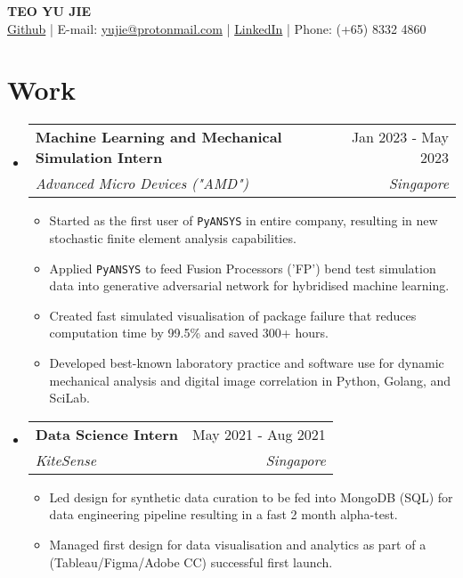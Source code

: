 \documentclass[letterpaper,11pt]{article}
\makeatletter
\newcommand{\resumeItem}[1]{
  \item{
    {#1 \vspace{-4pt}}
  }
}
\newcommand{\resumeSubheading}[4]{
  \vspace{-4pt}\item
    \begin{tabular*}{0.97\textwidth}[t]{l@{\extracolsep{\fill}}r}
      \textbf{#1} & #2 \\
      \textit{\small #3} & \textit{\small #4} \\
    \end{tabular*}\vspace{-10pt}
}
\newcommand{\resumeSubHeadingListStart}{\begin{itemize}[leftmargin=0.15in, label={}]}
\newcommand{\resumeSubHeadingListEnd}{\end{itemize}}
\newcommand{\resumeItemListStart}{\begin{itemize}}
\newcommand{\resumeItemListEnd}{\end{itemize}\vspace{-2pt}}
\makeatother
\begin{document}
\begin{center}
    {\Huge \textbf{TEO YU JIE}} \\ \vspace{3pt}
    \href{{https://github.com/yujieteo}}{\color{blue}Github} |
    E-mail: \href{mailto:{yujie@protonmail.com}}{\color{blue}yujie@protonmail.com} |
    \href{https://www.linkedin.com/in/yujieteo/}{\color{blue}LinkedIn} |
    Phone: (+65) 8332 4860
  \end{center}

\section{Work}
\resumeSubHeadingListStart

    \resumeSubheading
      {Machine Learning and Mechanical Simulation Intern}{Jan 2023 - May 2023}
      {Advanced Micro Devices ("AMD")}{Singapore}
      \resumeItemListStart
        \small
        \resumeItem{Started as the first user of \texttt{PyANSYS} in entire company, 
        resulting in new stochastic finite element analysis
        capabilities.}
        \resumeItem{Applied \texttt{PyANSYS} 
        to feed Fusion Processors ('FP') bend test simulation
        data into generative adversarial network for hybridised machine learning.}
        \resumeItem{Created fast simulated visualisation
        of package failure that reduces computation time by 99.5\%
        and saved 300+ hours.}
        \resumeItem{Developed best-known laboratory practice and software 
        use for dynamic mechanical analysis and digital image correlation in 
        Python, Golang, and SciLab.}
        \resumeItemListEnd

    \resumeSubheading
      {Data Science Intern}{May 2021 - Aug 2021}
      {KiteSense}{Singapore}
      \resumeItemListStart
        \small\resumeItem{Led design for synthetic data curation to be fed into MongoDB (SQL) for data engineering pipeline
        resulting in a fast 2 month alpha-test.}
        \resumeItem{Managed first design for data visualisation and analytics as part of a 
        (Tableau/Figma/Adobe CC) successful first launch.}
        \resumeItemListEnd

\resumeSubHeadingListEnd

\end{document}
